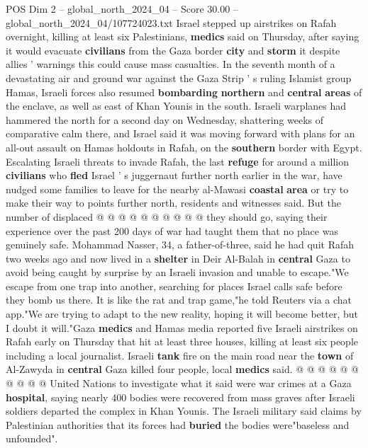 \begin{textsample}{POS Dim 2 – global\_north\_2024\_04 – Score 30.00 – global\_north\_2024\_04/107724023.txt}  \label{ex:f2_pos_261}
Israel stepped up airstrikes on Rafah overnight, killing at least six Palestinians, \textbf{medics} said on Thursday, after saying it would evacuate \textbf{civilians} from the Gaza border \textbf{city} and \textbf{storm} it despite allies ' warnings this could cause mass casualties.
In the seventh month of a devastating air and ground war against the Gaza Strip ' s ruling Islamist group Hamas, Israeli forces also resumed \textbf{bombarding} \textbf{northern} and \textbf{central} \textbf{areas} of the enclave, as well as east of Khan Younis in the south.
Israeli warplanes had hammered the north for a second day on Wednesday, shattering weeks of comparative calm there, and Israel said it was moving forward with plans for an all-out assault on Hamas holdouts in Rafah, on the \textbf{southern} border with Egypt.
Escalating Israeli threats to invade Rafah, the last \textbf{refuge} for around a million \textbf{civilians} who \textbf{fled} Israel ' s juggernaut further north earlier in the war, have nudged some families to leave for the nearby al-Mawasi \textbf{coastal} \textbf{area} or try to make their way to points further north, residents and witnesses said.
But the number of displaced @ @ @ @ @ @ @ @ @ @ they should go, saying their experience over the past 200 days of war had taught them that no place was genuinely safe.
Mohammad Nasser, 34, a father-of-three, said he had quit Rafah two weeks ago and now lived in a \textbf{shelter} in Deir Al-Balah in \textbf{central} Gaza to avoid being caught by surprise by an Israeli invasion and unable to escape."We escape from one trap into another, searching for places Israel calls safe before they bomb us there.
It is like the rat and trap game,"he told Reuters via a chat app."We are trying to adapt to the new reality, hoping it will become better, but I doubt it will."Gaza \textbf{medics} and Hamas media reported five Israeli airstrikes on Rafah early on Thursday that hit at least three houses, killing at least six people including a local journalist.
Israeli \textbf{tank} fire on the main road near the \textbf{town} of Al-Zawyda in \textbf{central} Gaza killed four people, local \textbf{medics} said. @ @ @ @ @ @ @ @ @ @ United Nations to investigate what it said were war crimes at a Gaza \textbf{hospital}, saying nearly 400 bodies were recovered from mass graves after Israeli soldiers departed the complex in Khan Younis.
The Israeli military said claims by Palestinian authorities that its forces had \textbf{buried} the bodies were"baseless and unfounded".

\end{textsample}
